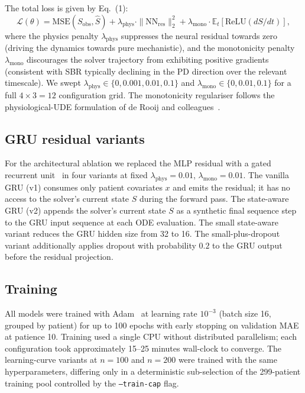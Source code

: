The total loss is given by Eq.~(1):
\begin{equation}
\mathcal{L}(\theta) = \mathrm{MSE}(S_{\mathrm{obs}}, \hat{S}) + \lambda_{\mathrm{phys}} \cdot \|\mathrm{NN}_{\mathrm{res}}\|_2^2 + \lambda_{\mathrm{mono}} \cdot \mathbb{E}_t\!\left[\mathrm{ReLU}(dS/dt)\right],
\label{eq:loss}
\end{equation}
where the physics penalty $\lambda_{\mathrm{phys}}$ suppresses the neural residual towards zero (driving the dynamics towards pure mechanistic), and the monotonicity penalty $\lambda_{\mathrm{mono}}$ discourages the solver trajectory from exhibiting positive gradients (consistent with SBR typically declining in the PD direction over the relevant timescale). We swept $\lambda_{\mathrm{phys}} \in \{0, 0.001, 0.01, 0.1\}$ and $\lambda_{\mathrm{mono}} \in \{0, 0.01, 0.1\}$ for a full $4 \times 3 = 12$ configuration grid. The monotonicity regulariser follows the physiological-UDE formulation of de Rooij and colleagues~\cite{deRooij2025physiology}.

\subsection{GRU residual variants}

For the architectural ablation we replaced the MLP residual with a gated recurrent unit~\cite{cho2014gru} in four variants at fixed $\lambda_{\mathrm{phys}} = 0.01$, $\lambda_{\mathrm{mono}} = 0.01$. The vanilla GRU (v1) consumes only patient covariates $x$ and emits the residual; it has no access to the solver's current state $S$ during the forward pass. The state-aware GRU (v2) appends the solver's current state $S$ as a synthetic final sequence step to the GRU input sequence at each ODE evaluation. The small state-aware variant reduces the GRU hidden size from 32 to 16. The small-plus-dropout variant additionally applies dropout with probability $0.2$ to the GRU output before the residual projection.

\subsection{Training}

All models were trained with Adam~\cite{kingma2014adam} at learning rate $10^{-3}$ (batch size 16, grouped by patient) for up to 100 epochs with early stopping on validation MAE at patience 10. Training used a single CPU without distributed parallelism; each configuration took approximately 15--25 minutes wall-clock to converge. The learning-curve variants at $n = 100$ and $n = 200$ were trained with the same hyperparameters, differing only in a deterministic sub-selection of the 299-patient training pool controlled by the \texttt{--train-cap} flag.

